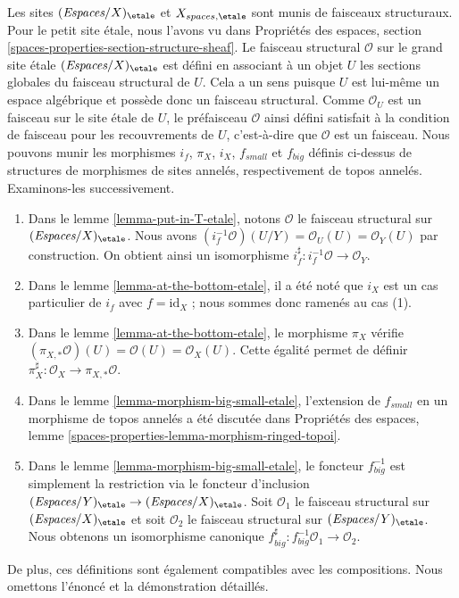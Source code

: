 \begin{remark}
\label{remark-change-topologies-ringed}
Les sites $(\textit{Espaces}/X)_\etale$ et $X_{spaces, \etale}$
sont munis de faisceaux structuraux. Pour le petit site \'etale, nous
l'avons vu dans Propriétés des espaces, section
\ref{spaces-properties-section-structure-sheaf}.
Le faisceau structural $\mathcal{O}$ sur le grand site \'etale
$(\textit{Espaces}/X)_\etale$ est défini en associant à un objet
$U$ les sections globales du faisceau structural de $U$.
Cela a un sens puisque $U$ est lui-même un espace algébrique
et possède donc un faisceau structural. Comme $\mathcal{O}_U$
est un faisceau sur le site \'etale de $U$, le préfaisceau $\mathcal{O}$
ainsi défini satisfait à la condition de faisceau pour les recouvrements de $U$, c'est-à-dire que
$\mathcal{O}$ est un faisceau.
Nous pouvons munir les morphismes $i_f$, $\pi_X$, $i_X$, $f_{small}$ et
$f_{big}$ définis ci-dessus de structures de morphismes de sites annelés, respectivement de topos annelés.
Examinons-les successivement.
\begin{enumerate}
\item Dans le lemme \ref{lemma-put-in-T-etale}, notons $\mathcal{O}$
le faisceau structural sur $(\textit{Espaces}/X)_\etale$.
Nous avons $(i_f^{-1}\mathcal{O})(U/Y) = \mathcal{O}_U(U) = \mathcal{O}_Y(U)$
par construction.
On obtient ainsi un isomorphisme $i_f^\sharp : i_f^{-1}\mathcal{O} \to \mathcal{O}_Y$.
\item Dans le lemme \ref{lemma-at-the-bottom-etale}, il a été noté
que $i_X$ est un cas particulier de $i_f$ avec $f = \text{id}_X$ ;
nous sommes donc ramenés au cas (1).
\item Dans le lemme \ref{lemma-at-the-bottom-etale}, le morphisme
$\pi_X$ vérifie $(\pi_{X, *}\mathcal{O})(U) = \mathcal{O}(U) =
\mathcal{O}_X(U)$. Cette égalité permet de définir
$\pi_X^\sharp : \mathcal{O}_X \to \pi_{X, *}\mathcal{O}$.
\item Dans le lemme \ref{lemma-morphism-big-small-etale},
l'extension de $f_{small}$ en un morphisme de topos annelés
a été discutée dans Propriétés des espaces, lemme
\ref{spaces-properties-lemma-morphism-ringed-topoi}.
\item Dans le lemme \ref{lemma-morphism-big-small-etale},
le foncteur $f_{big}^{-1}$ est simplement la restriction
via le foncteur d'inclusion
$(\textit{Espaces}/Y)_\etale \to (\textit{Espaces}/X)_\etale$.
Soit $\mathcal{O}_1$ le faisceau structural sur $(\textit{Espaces}/X)_\etale$
et soit $\mathcal{O}_2$ le faisceau structural sur $(\textit{Espaces}/Y)_\etale$.
Nous obtenons un isomorphisme canonique
$f_{big}^\sharp : f_{big}^{-1}\mathcal{O}_1 \to \mathcal{O}_2$.
\end{enumerate}
De plus, ces définitions sont également compatibles avec les compositions.
Nous omettons l'énoncé et la démonstration détaillés.
\end{remark}









